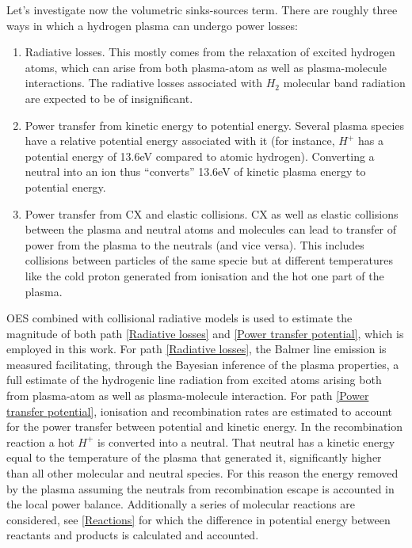 Let’s investigate now the volumetric sinks-sources term. There are roughly three ways in which a hydrogen plasma can undergo power losses:
\begin{enumerate}
    \item Radiative losses. This mostly comes from the relaxation of excited hydrogen atoms, which can arise from both plasma-atom as well as plasma-molecule interactions. The radiative losses associated with $H_2$ molecular band radiation are expected to be of insignificant.\cite{Groth2019} \label{Radiative losses}
    \item Power transfer from kinetic energy to potential energy. Several plasma species have a relative potential energy associated with it (for instance, $H^+$ has a potential energy of 13.6eV compared to atomic hydrogen). Converting a neutral into an ion thus “converts” 13.6eV of kinetic plasma energy to potential energy.  \label{Power transfer potential}
    \item Power transfer from CX and elastic collisions. CX as well as elastic collisions between the plasma and neutral atoms and molecules can lead to transfer of power from the plasma to the neutrals (and vice versa). This includes collisions between particles of the same specie but at different temperatures like the cold proton generated from ionisation and the hot one part of the plasma. \label{Power transfer CX}
\end{enumerate}

OES combined with collisional radiative models is used to estimate the magnitude of both path \ref{Radiative losses} and \ref{Power transfer potential}, which is employed in this work. For path \ref{Radiative losses}, the Balmer line emission is measured facilitating, through the Bayesian inference of the plasma properties, a full estimate of the hydrogenic line radiation from excited atoms arising both from plasma-atom as well as plasma-molecule interaction. For path \ref{Power transfer potential}, ionisation and recombination rates are estimated to account for the power transfer between potential and kinetic energy. In the recombination reaction a hot $H^+$ is converted into a neutral. That neutral has a kinetic energy equal to the temperature of the plasma that generated it, significantly higher than all other molecular and neutral species. For this reason the energy removed by the plasma assuming the neutrals from recombination escape is accounted in the local power balance. Additionally a series of molecular reactions are considered, see \autoref{Reactions} for which the difference in potential energy between reactants and products is calculated and accounted.

